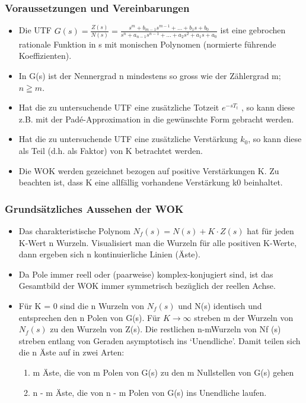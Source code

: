 \subsubsection{Voraussetzungen und Vereinbarungen}
\begin{itemize}
\item  Die UTF $G(s)=\frac{Z(s)}{N(s)}=\frac{s^m + b_{m-1}s^{m-1}+ ... + b_{1}s+b_{0}}{s^{n}+a_{n-1}s^{n-1} + ... + a_{2}s^{2}+a_{1}s + a_{0}}$
ist eine gebrochen rationale
Funktion in s mit monischen Polynomen (normierte führende Koeffizienten).
\item  In G(s) ist der Nennergrad n mindestens so gross wie der Zählergrad m; $n \geqq m$.
\item  Hat die zu untersuchende UTF eine zusätzliche Totzeit $e^{-sT_t}$ , so kann diese
z.B. mit der Padé-Approximation in die gewünschte Form gebracht werden.
\item  Hat die zu untersuchende UTF eine zusätzliche Verstärkung $k_0$, so kann diese
als Teil (d.h. als Faktor) von K betrachtet werden.
\item  Die WOK werden gezeichnet bezogen auf positive Verstärkungen K. Zu beachten
ist, dass K eine allfällig vorhandene Verstärkung k0 beinhaltet.
\end{itemize}

\subsubsection{Grundsätzliches Aussehen der WOK}
\begin{itemize}
\item  Das charakteristische Polynom $N_f (s) = N(s)+K \cdot Z(s)$ hat für jeden K-Wert
n Wurzeln. Visualisiert man die Wurzeln für alle positiven K-Werte, dann
ergeben sich n kontinuierliche Linien (Äste).
\item  Da Pole immer reell oder (paarweise) komplex-konjugiert sind, ist das Gesamtbild
der WOK immer symmetrisch bezüglich der reellen Achse.
\item  Für K = 0 sind die n Wurzeln von $N_f(s)$ und N(s) identisch und entsprechen
den n Polen von G(s).
Für $K \rightarrow \infty$ streben m der Wurzeln von $N_f(s)$ zu den Wurzeln von Z(s). Die
restlichen n-mWurzeln von Nf (s) streben entlang von Geraden asymptotisch
ins ‘Unendliche’.
Damit teilen sich die n Äste auf in zwei Arten:
\begin{enumerate}
\item m Äste, die von m Polen von G(s) zu den m Nullstellen von G(s) gehen
\item n - m Äste, die von n - m Polen von G(s) ins Unendliche laufen.
\end{enumerate}
\end{itemize}

